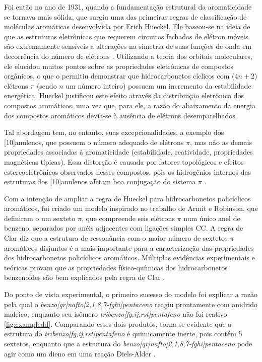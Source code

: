 Foi então no ano de 1931, quando a fundamentação estrutural da aromaticidade se tornava mais sólida, que surgiu uma das primeiras regras de classificação de moléculas aromáticas desenvolvida por Erich Hueckel\autocite{Hckel1931}. Ele baseou-se na ideia de que as estruturas eletrônicas que requerem circuitos fechados de elétron móveis são extremamente sensíveis a alterações na simetria de suas funções de onda em decorrência do número de elétrons \autocite{Hckel1931, Schleyer1996, Schleyer2001}. Utilizando a teoria dos orbitais moleculares, ele elucidou muitos pontos sobre as propriedades eletrônicas de compostos orgânicos, o que o permitiu demonstrar que hidrocarbonetos cíclicos com ($4n+2$) elétrons $\pi$ (sendo $n$ um número inteiro) possuem um incremento da estabilidade energética. Hueckel\autocite{Hckel1931, Brogli1972} justificou este efeito através da distribuição eletrônica dos compostos aromáticos, uma vez que, para ele, a razão do abaixamento da energia dos compostos aromáticos devia-se à ausência de elétrons desemparelhados.

Tal abordagem tem, no entanto, suas excepcionalidades, a exemplo dos [10]anulenos, que possuem o número adequado de elétrons $\pi$, mas não as demais propriedades associadas à aromaticidade (estabilidade, reatividade, propriedades magnéticas típicas). Essa distorção é causada por fatores topológicos e efeitos estereoeletrônicos observados nesses compostos, pois os hidrogênios internos das estruturas dos [10]anulenos afetam boa conjugação do sistema $\pi$ \autocite{Caramori2006}. 

Com a intenção de ampliar a regra de Hueckel para hidrocarbonetos policíclicos aromáticos, foi criado um modelo inspirado no trabalho de Armit e Robinson, que definiram o um sexteto $\pi$, que compreende seis elétrons $\pi$ num único anel de benzeno, separados por anéis adjacentes com ligações simples CC. A regra de Clar diz que a estrutura de ressonância com o maior número de sextetos $\pi$ aromáticos disjuntos é a mais importante para a caracterização das propriedades dos hidrocarbonetos policíclicos aromáticos. Múltiplas evidências experimentais e teóricas provam que as propriedades físico-químicas dos hidrocarbonetos benzenoides são bem explicados pela regra de Clar \autocite{Sola2013}. 

Do ponto de vista experimental, o primeiro sucesso do modelo foi explicar a razão pela qual o \textit{benzo[qr]nafto[2,1,8,7-fghi]pentaceno}
reagiu prontamente com anidrido maleico, enquanto seu isômero \textit{tribenzo[fg,ij,rst]pentafeno} não foi reativo \autoref{fig:exampledd}. Comparando esses dois produtos, torna-se evidente que a estrutura do \textit{tribenzo[fg,ij,rst]pentafeno} é quimicamente inerte, pois contém 5 sextetos, enquanto que a estrutura do \textit{benzo[qr]nafto[2,1,8,7-fghi]pentaceno} pode agir como um dieno em uma reação Diels-Alder \autocite{Clar1958}.

